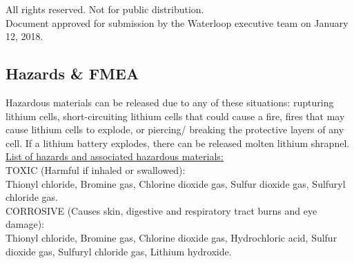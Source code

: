 \documentclass[hidelinks, twoside]{report}
\begin{document}
    All rights reserved. Not for public distribution.\\

    Document approved for submission by the Waterloop executive team on January 12, 2018.

    \tableofcontents
    \newpage

 	
    
    
    
    
    
    
    
    
    
    
    

    \begin{appendices}
        \makeatletter
        \makeatother
        
        \chapter{Hazards \& FMEA}

Hazardous materials can be released due to any of these situations: rupturing lithium cells, short-circuiting lithium cells that could cause a fire, fires that may cause lithium cells to explode, or piercing/ breaking the protective layers of any cell. If a lithium battery explodes, there can be released molten lithium shrapnel.\\

\noindent \underline{List of hazards and associated hazardous materials:}\\

\noindent TOXIC (Harmful if inhaled or swallowed):\\
\noindent Thionyl chloride, Bromine gas, Chlorine dioxide gas, Sulfur dioxide gas, Sulfuryl chloride gas.\\

\noindent CORROSIVE (Causes skin, digestive and respiratory tract burns and eye damage):\\
\noindent Thionyl chloride, Bromine gas, Chlorine dioxide gas, Hydrochloric acid, Sulfur dioxide gas, Sulfuryl chloride gas, Lithium hydroxide.\\


\end{appendices}
\end{document}
